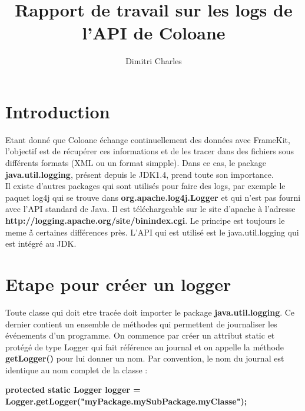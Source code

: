 \documentclass[a4paper,10pt]{report}
\title{Rapport de travail sur les logs de l'API de Coloane}
\author{Dimitri Charles}
\begin{document}
\maketitle
\section{Introduction}
\indent
Etant donn\'e que Coloane \'echange continuellement des donn\'ees avec FrameKit, l'objectif est de r\'ecup\'erer ces informations et de les tracer dans des fichiers sous diff\'erents formats (XML ou un format simpple). Dans ce cas, le package \textbf{java.util.logging}, pr\'esent depuis le JDK1.4, prend toute son importance. 
\\
Il existe d'autres packages qui sont utilisés pour faire des logs, par exemple le paquet log4j qui se trouve dans \textbf{org.apache.log4j.Logger} et qui n'est pas fourni avec l'API standard de Java. Il est t\'el\'echargeable sur le site d'apache \`a l'adresse \textbf{http://logging.apache.org/site/binindex.cgi}. Le principe est toujours le meme \'à  certaines diff\'erences pr\`es. L'API qui est utilis\'e est le java.util.logging qui est int\'egr\'e au JDK.
\\
\section{Etape pour cr\'eer un logger}
Toute classe qui doit etre trac\'ee doit importer le package \textbf{java.util.logging}. Ce dernier contient un ensemble de m\'ethodes qui permettent de journaliser les \'ev\'enements d'un programme. On commence par cr\'eer un attribut static et prot\'eg\'e  de type Logger qui fait r\'ef\'erence au journal et on appelle la m\'ethode \textbf{getLogger()} pour lui donner un nom. Par convention, le nom du journal est identique au nom complet de la classe :

\begin{center}
 \textbf{protected static Logger logger =
Logger.getLogger("myPackage.mySubPackage.myClasse");}
\end{center}
\end{document}
